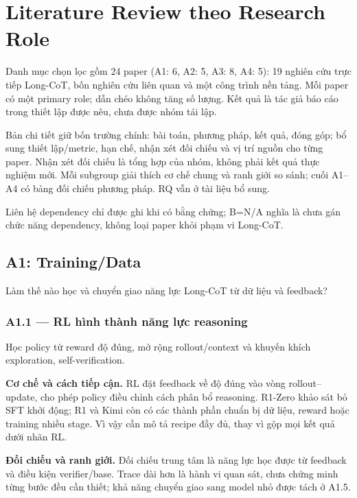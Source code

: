 \section{Literature Review theo Research Role}
\label{sec:research_roles}

Danh mục chọn lọc gồm 24 paper (A1: 6, A2: 5, A3: 8, A4: 5): 19 nghiên cứu trực tiếp Long-CoT, bốn nghiên cứu liên quan và một công trình nền tảng. Mỗi paper có một primary role; dẫn chéo không tăng số lượng. Kết quả là tác giả báo cáo trong thiết lập được nêu, chưa được nhóm tái lập.

Bản chi tiết giữ bốn trường chính: bài toán, phương pháp, kết quả, đóng góp; bổ sung thiết lập/metric, hạn chế, nhận xét đối chiếu và vị trí nguồn cho từng paper. Nhận xét đối chiếu là tổng hợp của nhóm, không phải kết quả thực nghiệm mới. Mỗi subgroup giải thích cơ chế chung và ranh giới so sánh; cuối A1–A4 có bảng đối chiếu phương pháp. RQ vẫn ở tài liệu bổ sung.

Liên hệ dependency chỉ được ghi khi có bằng chứng; B=N/A nghĩa là chưa gán chức năng dependency, không loại paper khỏi phạm vi Long-CoT.

\subsection{A1: Training/Data}
\label{subsec:a1_review}

Làm thế nào học và chuyển giao năng lực Long-CoT từ dữ liệu và feedback?

\subsubsection*{A1.1 — RL hình thành năng lực reasoning}
Học policy từ reward độ đúng, mở rộng rollout/context và khuyến khích exploration, self-verification.

\noindent\textbf{Cơ chế và cách tiếp cận.} RL đặt feedback về độ đúng vào vòng rollout–update, cho phép policy điều chỉnh cách phân bổ reasoning. R1-Zero khảo sát bỏ SFT khởi động; R1 và Kimi còn có các thành phần chuẩn bị dữ liệu, reward hoặc training nhiều stage. Vì vậy cần mô tả recipe đầy đủ, thay vì gộp mọi kết quả dưới nhãn RL.\par
\noindent\textbf{Đối chiếu và ranh giới.} Đối chiếu trung tâm là năng lực học được từ feedback và điều kiện verifier/base. Trace dài hơn là hành vi quan sát, chưa chứng minh từng bước đều cần thiết; khả năng chuyển giao sang model nhỏ được tách ở A1.5.\par

